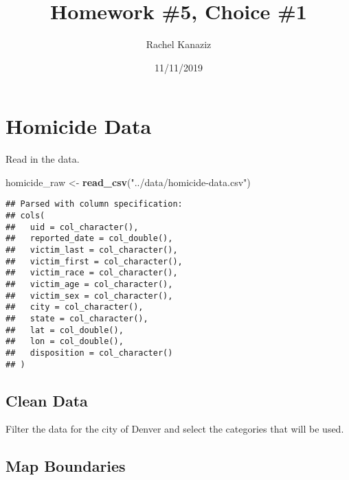 \documentclass[]{article}
\title{Homework \#5, Choice \#1}
\author{Rachel Kanaziz}
\date{11/11/2019}
\newenvironment{Shaded}{\begin{snugshade}}{\end{snugshade}}
\newcommand{\KeywordTok}[1]{\textcolor[rgb]{0.13,0.29,0.53}{\textbf{#1}}}
\newcommand{\NormalTok}[1]{#1}
\newcommand{\OperatorTok}[1]{\textcolor[rgb]{0.81,0.36,0.00}{\textbf{#1}}}
\newcommand{\StringTok}[1]{\textcolor[rgb]{0.31,0.60,0.02}{#1}}
\begin{document}
\maketitle

\hypertarget{homicide-data}{%
\section{Homicide Data}\label{homicide-data}}

Read in the data.

\begin{Shaded}
\begin{Highlighting}[]
\NormalTok{homicide_raw <-}\StringTok{ }\KeywordTok{read_csv}\NormalTok{(}\StringTok{"../data/homicide-data.csv"}\NormalTok{)}
\end{Highlighting}
\end{Shaded}

\begin{verbatim}
## Parsed with column specification:
## cols(
##   uid = col_character(),
##   reported_date = col_double(),
##   victim_last = col_character(),
##   victim_first = col_character(),
##   victim_race = col_character(),
##   victim_age = col_character(),
##   victim_sex = col_character(),
##   city = col_character(),
##   state = col_character(),
##   lat = col_double(),
##   lon = col_double(),
##   disposition = col_character()
## )
\end{verbatim}

\hypertarget{clean-data}{%
\subsection{Clean Data}\label{clean-data}}

Filter the data for the city of Denver and select the categories that
will be used.

\begin{Shaded}
\end{Shaded}

\hypertarget{map-boundaries}{%
\subsection{Map Boundaries}\label{map-boundaries}}
\end{document}

